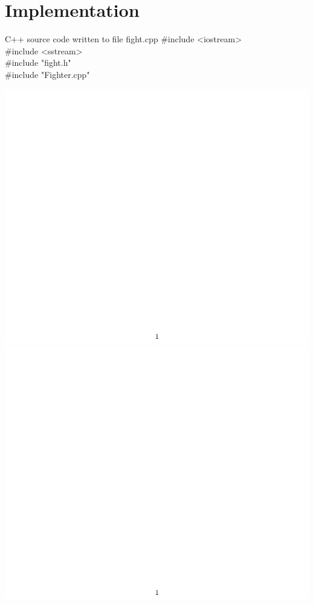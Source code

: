 \documentclass{article}
\begin{document}
\section*{Implementation}
\begin{GFT}{C++ source code written to file fight.cpp}
\+\#include <iostream>\\
\+\#include <sstream>\\
\+\#include "fight.h"\\
\+\#include "Fighter.cpp"\\
\end{GFT}
\includegraphics[page=2]{Fighter.pdf}
\includegraphics[page=3]{Fighter.pdf}
\end{document}
